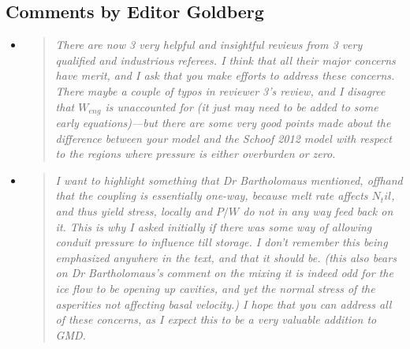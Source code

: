 \documentclass[11pt,reqno]{amsart}
\newcommand{\reply}[2]{
\medskip\medskip
\item  \begin{quote}
\emph{#1}
\end{quote}

\medskip
\noindent #2}
\begin{document}
\subsection*{Comments by Editor Goldberg}\begin{itemize}
\reply{There are now 3 very helpful and insightful reviews from 3 very qualified and industrious
referees. I think that all their major concerns have merit, and I ask that you make efforts
to address these concerns. There maybe a couple of typos in reviewer 3's review, and
I disagree that $W_{eng}$ is unaccounted for (it just may need to be added to some early
equations)---but there are some very good points made about the difference between
your model and the Schoof 2012 model with respect to the regions where pressure is
either overburden or zero.}
{}

\reply{I want to highlight something that Dr Bartholomaus mentioned, offhand that the coupling is essentially one-way, because melt rate affects $N_til$, and thus yield stress, locally and $P/W$ do not in any way feed back on it. This is why I asked initially if there was
some way of allowing conduit pressure to influence till storage. I don't remember this
being emphasized anywhere in the text, and that it should be. (this also bears on Dr
Bartholomaus's comment on the mixing it is indeed odd for the ice flow to be opening
up cavities, and yet the normal stress of the asperities not affecting basal velocity.)
I hope that you can address all of these concerns, as I expect this to be a very valuable
addition to GMD.}
{}

\end{itemize}
\end{document}
